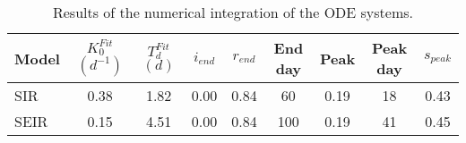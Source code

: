 \begin{table}[h]
\centering
\caption{Results of the numerical integration of the ODE systems.}
\label{tab:models}
\begin{tabular}{lcccccccc}
\toprule
           Model & $K_0^{Fit}$ $(d^{-1})$ & $T_d^{Fit}$ $(d)$ & $i_{end}$ & $r_{end}$ & End day & Peak  & Peak day & $s_{peak}$\\
\midrule
SIR &               0.38 &              1.82 &      0.00 &      0.84 &             60 &      0.19 &              18   &   0.43 \\
SEIR &              0.15 &              4.51 &      0.00 &      0.84 &            100 &      0.19 &              41   &   0.45 \\
\bottomrule
\end{tabular}
\end{table}